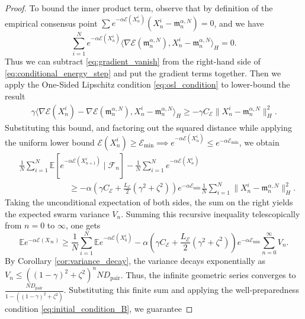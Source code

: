 \documentclass[12pt]{amsart}
\numberwithin{equation}{section}
\begin{document}
\begin{proof}
To bound the inner product term, 
observe that by 
definition of the empirical consensus point $\sum e^{-\alpha \mathscr{E}(X_n^i)}(X_n^i - \mathfrak{m}_n^{\alpha, N}) = 0$, and we have
\begin{equation}\label{eq:gradient_vanish}
    \sum_{i=1}^N e^{-\alpha \mathscr{E}(X_n^i)} \langle \nabla \mathscr{E}(\mathfrak{m}_n^{\alpha, N}), X_n^i - \mathfrak{m}_n^{\alpha, N} \rangle_H = 0.
\end{equation}
Thus we can subtract \eqref{eq:gradient_vanish} from the right-hand side of \eqref{eq:conditional_energy_step} and put the gradient terms together. Then we apply the One-Sided Lipschitz condition \eqref{eq:osl_condition} to lower-bound the result
\begin{align*}
    \gamma \langle \nabla \mathscr{E}(X_n^i) - \nabla \mathscr{E}(\mathfrak{m}_n^{\alpha, N}), X_n^i - \mathfrak{m}_n^{\alpha, N} \rangle_H \ge -\gamma C_{\mathscr{E}} \|X_n^i - \mathfrak{m}_n^{\alpha, N}\|_H^2.
\end{align*}
Substituting this bound, and factoring out the squared distance while applying the uniform lower bound $\mathscr{E}(X_n^i) \ge \mathscr{E}_{\min} \implies e^{-\alpha \mathscr{E}(X_n^i)} \le e^{-\alpha \mathscr{E}_{\min}}$, we obtain
\begin{align*}
    &\frac{1}{N} \sum_{i=1}^N \mathbb{E}[e^{-\alpha \mathscr{E}(X_{n+1}^i)} \mid \mathcal{F}_n] - \frac{1}{N} \sum_{i=1}^N e^{-\alpha \mathscr{E}(X_n^i)} \\
    &\qquad \qquad \qquad \ge -\alpha \left( \gamma C_{\mathscr{E}} + \frac{L_\mathscr{E}}{2}(\gamma^2 + \zeta^2) \right) e^{-\alpha \mathscr{E}_{\min}} \frac{1}{N} \sum_{i=1}^N \|X_n^i - \mathfrak{m}_n^{\alpha, N}\|_H^2.
\end{align*}
Taking the unconditional expectation of both sides, the sum on the right yields the expected swarm variance $V_n$. Summing this recursive inequality telescopically from  $n=0$ to $\infty$, one gets
\begin{equation*}
    \mathbb{E} e^{-\alpha \mathscr{E}(X_\infty)} \ge \frac{1}{N} \sum_{i=1}^N \mathbb{E} e^{-\alpha \mathscr{E}(X_0^i)} - \alpha \left( \gamma C_{\mathscr{E}} + \frac{L_\mathscr{E}}{2}(\gamma^2 + \zeta^2) \right) e^{-\alpha \mathscr{E}_{\min}} \sum_{n=0}^\infty V_n.
\end{equation*}
By Corollary \ref{cor:variance_decay}, the variance decays exponentially as $V_n \le ((1-\gamma)^2 + \zeta^2)^n ND_{\text{pair}}$. Thus, the infinite geometric series converges to $\frac{ND_{\text{pair}}}{1 - ((1-\gamma)^2 + \zeta^2)}$. Substituting this finite sum and applying the well-preparedness condition \eqref{eq:initial_condition_B}, we guarantee

\end{proof}
\end{document}
